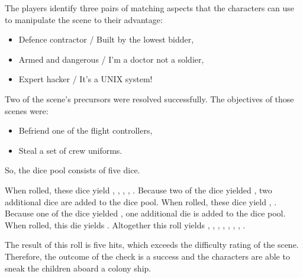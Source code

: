 \documentclass[12pt, a5paper, parskip=half-]{scrartcl}
\begin{document}
The players identify three pairs of matching aspects that the characters can use to manipulate the scene to their advantage:
\begin{itemize}[leftmargin=\widthof{\hspace{0.25cm}\textbullet\space}, noitemsep, topsep=-1ex]
\item Defence contractor / Built by the lowest bidder,
\item Armed and dangerous / I'm a doctor not a soldier,
\item Expert hacker / It's a UNIX system!
\end{itemize}
\vspace{1ex}
Two of the scene's precursors were resolved successfully. The objectives of those scenes were:
\begin{itemize}[leftmargin=\widthof{\hspace{0.25cm}\textbullet\space}, nosep, topsep=-1ex]
\item Befriend one of the flight controllers,
\item Steal a set of crew uniforms.
\end{itemize}
\vspace{1ex}
So, the dice pool consists of five dice.

When rolled, these dice yield , , , ,  .%
Because two of the dice yielded , two additional dice are added to the dice pool.
When rolled, these dice yield , .%
Because one of the dice yielded , one additional die is added to the dice pool.
When rolled, this die yields .
Altogether this roll yields , , , , , , , .%

The result of this roll is five hits, which exceeds the difficulty rating of the scene.
Therefore, the outcome of the check is a success and the characters are able to sneak the children aboard a colony ship.
\end{document}
